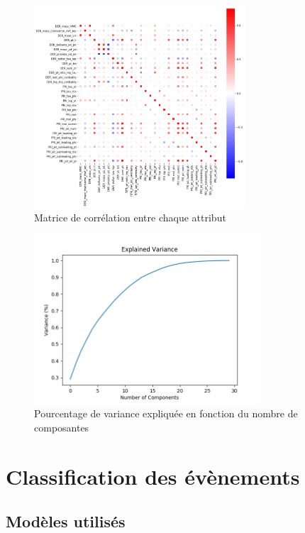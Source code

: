 \documentclass[12pt]{article}
\begin{document}
\begin{figure}[H]
    \center
    \includegraphics[width=0.7\textwidth]{images/correlation_matrix.png}
    \caption{Matrice de corrélation entre chaque attribut}
    \label{img:corr-mat}
\end{figure}

\begin{figure}[H]
    \center
    \includegraphics[width=0.75\textwidth]{images/explained_variance.png}
    \caption{Pourcentage de variance expliquée en fonction du nombre de
    composantes}
    \label{img:explained-var}
\end{figure}

\section{Classification des évènements}

\subsection{Modèles utilisés}
\end{document}
